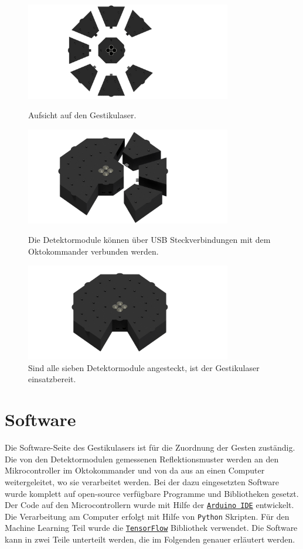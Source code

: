 \begin{figure}[h]
	\centering
	\includegraphics[width=9cm]{../CAD_Bilder/Gestikulaser_raytraced_2.png}
	\caption{Aufsicht auf den Gestikulaser.}
	\label{fig:AufsichtGestikulaser}
	\vfill
	\includegraphics[width=9cm]{../CAD_Bilder/Gestikulaser_raytraced_4.png}
	\caption{Die Detektormodule können über USB Steckverbindungen mit dem Oktokommander verbunden werden.}
	\label{fig:GestikulaserKombination}
	\vfill
	\includegraphics[width=9cm]{../CAD_Bilder/Gestikulaser_raytraced.png}
	\caption{Sind alle sieben Detektormodule angesteckt, ist der Gestikulaser einsatzbereit.}
	\label{fig:Gestikulaser}
\end{figure}



\section{Software}
\label{sec:Software}

Die Software-Seite des Gestikulasers ist für die Zuordnung der Gesten zuständig. Die von den Detektormodulen gemessenen Reflektionsmuster werden an den Mikrocontroller im Oktokommander und von da aus an einen Computer weitergeleitet, wo sie verarbeitet werden. Bei der dazu eingesetzten Software wurde komplett auf open-source verfügbare Programme und Bibliotheken gesetzt. Der Code auf den Microcontrollern wurde mit Hilfe der \href{https://www.arduino.cc/en/Main/Software}{\texttt{Arduino IDE}} entwickelt. Die Verarbeitung am Computer erfolgt mit Hilfe von \texttt{Python} Skripten. Für den Machine Learning Teil wurde die \href{https://www.tensorflow.org/}{\texttt{TensorFlow}\texttrademark} Bibliothek verwendet. Die Software kann in zwei Teile unterteilt werden, die im Folgenden genauer erläutert werden.

